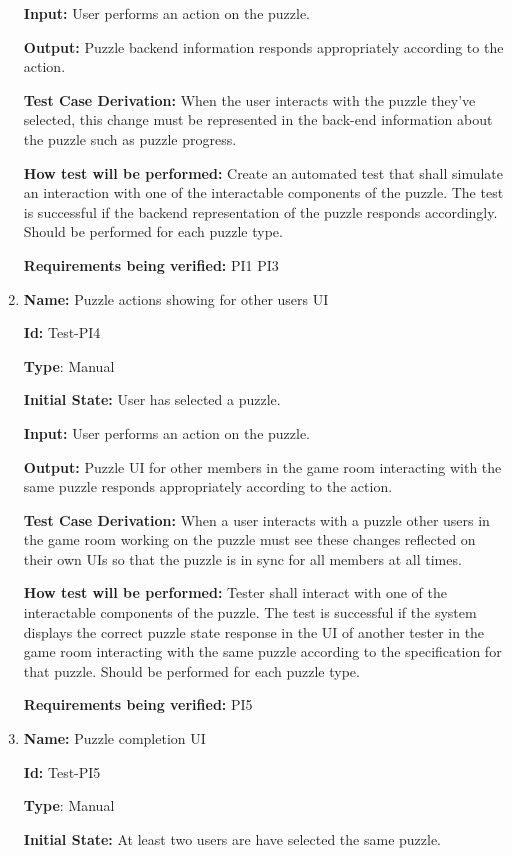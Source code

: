 \documentclass[12pt, titlepage]{article}
\begin{document}
\begin{enumerate}
\textbf{Input:} User performs an action on the puzzle.

\textbf{Output:} Puzzle backend information responds appropriately according to the action.

\textbf{Test Case Derivation:}
When the user interacts with the puzzle they've selected, this change must be represented in the back-end information about the puzzle such as puzzle progress.

\textbf{How test will be performed:}
Create an automated test that shall simulate an interaction with one of the interactable components of the puzzle. The test is successful if the backend representation of the puzzle responds accordingly. Should be performed for each puzzle type.

\textbf{Requirements being verified: } PI1 PI3

\item{\textbf{Name:} Puzzle actions showing for other users UI}

\textbf{Id:} Test-PI4

\textbf{Type}: Manual

\textbf{Initial State:} User has selected a puzzle.

\textbf{Input:} User performs an action on the puzzle.

\textbf{Output:} Puzzle UI for other members in the game room interacting with the same puzzle responds appropriately according to the action.

\textbf{Test Case Derivation:}
When a user interacts with a puzzle other users in the game room working on the puzzle must see these changes reflected on their own UIs so that the puzzle is in sync for all members at all times.

\textbf{How test will be performed:}
Tester shall interact with one of the interactable components of the puzzle. The test is successful if the system displays the correct puzzle state response in the UI of another tester in the game room interacting with the same puzzle according to the specification for that puzzle. Should be performed for each puzzle type.

\textbf{Requirements being verified: } PI5

\item{\textbf{Name:} Puzzle completion UI}

\textbf{Id:} Test-PI5

\textbf{Type}: Manual

\textbf{Initial State:} At least two users are have selected the same puzzle.


\end{enumerate}
\end{document}
